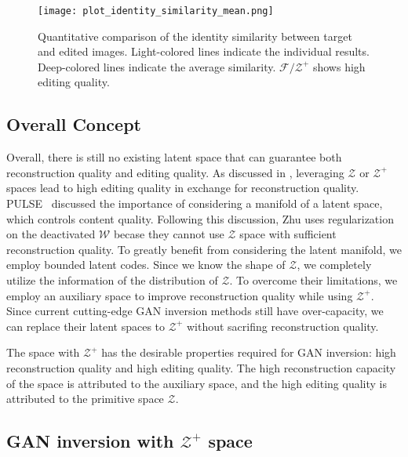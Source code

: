\documentclass[10pt,twocolumn,letterpaper]{article}
\newcommand{\WS}{\mathcal{W}}
\newcommand{\ZS}{\mathcal{Z}}
\newcommand{\ZPS}{\mathcal{Z}^{+}}
\newcommand{\FZS}{\mathcal{F}/\mathcal{Z}^{+}}
\begin{document}
\begin{figure}[tb]
\centering
\texttt{[image: plot\_identity\_similarity\_mean.png]}
\vspace{-0.8em}
\caption{Quantitative comparison of the identity similarity between target and edited images. Light-colored lines indicate the individual results. Deep-colored lines indicate the average similarity.
$\FZS$ shows high editing quality.\vspace{-0.8em}}\label{fig:identity_similarity}
\end{figure}



\subsection{Overall Concept}
Overall, there is still no existing latent space that can guarantee both reconstruction quality and editing quality. As discussed in \cite{menon2020pulse,zhu2020improved,song2021agilegan,wulff2020improving}, leveraging $\ZS$ or $\ZPS$ spaces lead to high editing quality in exchange for reconstruction quality.
PULSE~\cite{menon2020pulse} discussed the importance of
considering a manifold of a latent space, which controls content quality. Following this discussion, Zhu \etal\cite{zhu2020improved} uses regularization on the deactivated $\WS$ becase they cannot use $\ZS$ space with sufficient reconstruction quality.
To greatly benefit from considering the latent manifold, we employ bounded latent codes. Since we know the shape of $\ZS$,
we completely utilize the information of the distribution of $\ZS$.
To overcome their limitations, we employ an auxiliary space to improve reconstruction quality while using $\ZPS$.
Since current cutting-edge GAN inversion methods still have over-capacity, we can replace their latent spaces
to $\ZPS$ without sacrifing reconstruction quality.

The space with $\ZPS$ has the desirable properties required for GAN inversion: high reconstruction quality and high editing quality.
The high reconstruction capacity of the space is attributed to the auxiliary space, and the high editing quality is attributed to the primitive space $\ZS$.

\subsection{GAN inversion with \texorpdfstring{$\ZPS$}{Z+} space}
\end{document}

